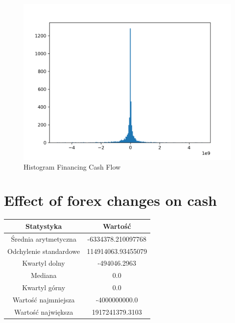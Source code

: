 \documentclass{article}
\begin{document}
\begin{figure}[h!]
    \includegraphics[width=\linewidth]{variables/Financing Cash Flow.png}
    \caption{Histogram Financing Cash Flow }
\end{figure}\section{ Effect of forex changes on cash }

\begin{center}
    \begin{tabular}{|c | c|} 
    \hline
    Statystyka & Wartość \\
    \hline\hline
    Średnia arytmetyczna & -6334378.210097768 \\ 
    \hline
    Odchylenie standardowe & 114914063.93455079 \\
    \hline
    Kwartyl dolny & -494046.2963 \\
    \hline
    Mediana & 0.0 \\
    \hline
    Kwartyl górny & 0.0 \\
    \hline
    Wartość najmniejsza & -4000000000.0 \\
    \hline
    Wartość największa & 1917241379.3103 \\
    \hline
   \end{tabular}
\end{center}
\end{document}
